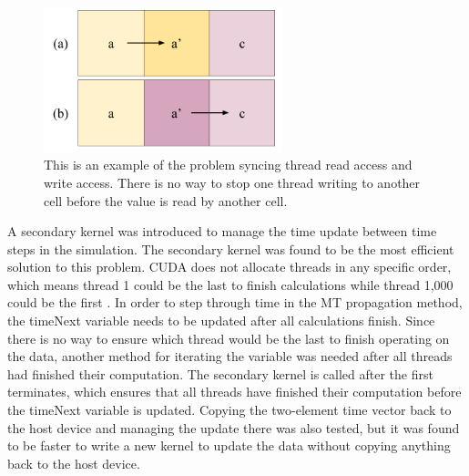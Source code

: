\begin{figure}%
\centering
  \includegraphics[height=4.2cm]{figures/implementation/read-write-issue.png}
  \caption{This is an example of the problem syncing thread read access and write access. There is no way to stop one thread writing to another cell before the value is read by another cell.}
  \label{fig:readwrite}
\end{figure}

A secondary kernel was introduced to manage the time update between time steps in the simulation. The secondary kernel was found to be the most efficient solution to this problem. CUDA does not allocate threads in any specific order, which means thread 1 could be the last to finish calculations while thread 1,000 could be the first \cite{cudabyexample}. In order to step through time in the MT propagation method, the timeNext variable needs to be updated after all calculations finish. Since there is no way to ensure which thread would be the last to finish operating on the data, another method for iterating the variable was needed after all threads had finished their computation. The secondary kernel is called after the first terminates, which ensures that all threads have finished their computation before the timeNext variable is updated. Copying the two-element time vector back to the host device and managing the update there was also tested, but it was found to be faster to write a new kernel to update the data without copying anything back to the host device.

